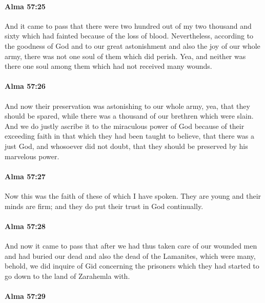 		\paragraph{Alma 57:25} %
			\label{ALMA-57-25}

			And it came to pass that
			there were two hundred out of my two thousand and sixty
			which had fainted because of the loss of blood.
			Nevertheless, according to the goodness of God
			and to our great astonishment and also the joy of our whole army,
			there was not one soul of them which did perish.
			Yea, and neither was there one soul among them
			which had not received many wounds.

		\paragraph{Alma 57:26} %
			\label{ALMA-57-26}

			And now their preservation was astonishing to our whole army,
			yea, that they should be spared,
			while there was a thousand of our brethren which were slain.
			And we do justly ascribe it to the miraculous power of God
			because of their exceeding faith in that which they had been taught to believe,
			that there was a just God,
			and whosoever did not doubt,
			that they should be preserved by his marvelous power.

		\paragraph{Alma 57:27} %
			\label{ALMA-57-27}

			Now this was the faith of these of which I have spoken.
			They are young and their minds are firm;
			and they do put their trust in God continually.

		\paragraph{Alma 57:28} %
			\label{ALMA-57-28}

			And now it came to pass that after we had thus taken care of our wounded men
			and had buried our dead and also the dead of the Lamanites, which were many,
			behold, we did inquire of Gid concerning the prisoners
			which they had started to go down to the land of Zarahemla with.

		\paragraph{Alma 57:29} %
			\label{ALMA-57-29}

